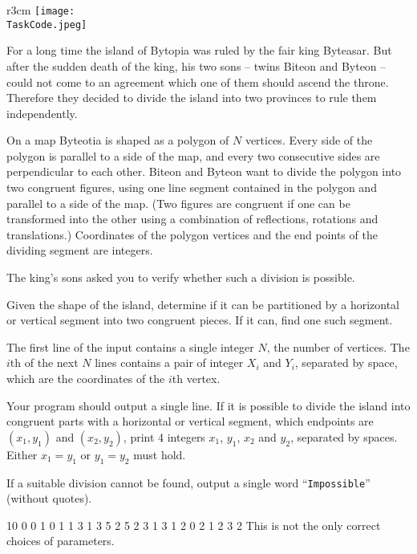 \documentclass{boi2014}
\renewcommand{\TaskCode}{demarcation}
\newcommand{\constant}[1]{{\tt #1}}
\begin{document}
    \begin{wrapfigure}{r}{3cm}
        \vspace{-24pt}
		\texttt{[image: \\TaskCode.jpeg]}
	\end{wrapfigure}

    For a long time the island of Bytopia was ruled by the fair king
    Byteasar. But after the sudden death
    of the king, his two sons -- twins Biteon and Byteon -- could
    not come to an agreement which one of them should ascend the throne.
    Therefore they decided to divide the island into two provinces to
    rule them independently.  
 
    On a map Byteotia is shaped as a polygon of $N$ vertices. Every
    side of the polygon is parallel to a side of the map, and every
    two consecutive sides are perpendicular to each other.  Biteon
    and Byteon want to divide the polygon into two congruent figures,
    using one line segment contained in the polygon and parallel to a
    side of the map.  (Two figures are congruent if one can be transformed
    into the other using a combination of reflections, rotations and
    translations.) Coordinates of the polygon vertices and the end points
    of the dividing segment are integers.  
 
    The king's sons asked you to verify whether such a division is
    possible.

    \Task

    Given the shape of the island, determine if it can be partitioned
    by a horizontal or vertical segment into two congruent pieces. If
    it can, find one such segment.

    \Input
	The first line of the input contains a single integer $N$, the number of
	vertices. The $i$th of the next $N$ lines contains a pair of integer $X_i$
	and $Y_i$, separated by space, which are the coordinates of the $i$th
	vertex.

	\Output
	Your program should output a single line. If it is possible to divide the
	island into congruent parts with a horizontal or vertical segment, which
	endpoints are $(x_1, y_1)$ and $(x_2, y_2)$, print 4 integers $x_1$,
	$y_1$, $x_2$ and $y_2$, separated by spaces.
	Either $x_1 = y_1$ or $y_1 = y_2$ must hold.

	If a suitable division cannot be found, output a single word
	``\constant{Impossible}'' (without quotes).

    \Examples
	\example
	{
		10
		0 0
		1 0
		1 1
		3 1
		3 5
		2 5
		2 3
		1 3
		1 2
		0 2
	}
	{
		1 2 3 2
	}
	{
		This is not the only correct choices of parameters.
	}
\end{document}
